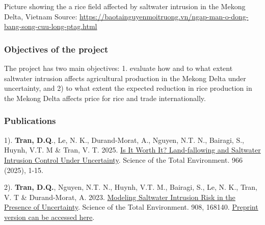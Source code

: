 \documentclass[
]{article}
\author{}
\date{\vspace{-2.5em}}
\begin{document}
\hypertarget{section}{%
\section{}\label{section}}

\hypertarget{section-1}{%
\section{}\label{section-1}}

Picture showing the a rice field affected by saltwater intrusion in the
Mekong Delta, Vietnam Source:
\url{https://baotainguyenmoitruong.vn/ngap-man-o-dong-bang-song-cuu-long-ptag.html}

\hypertarget{objectives-of-the-project}{%
\subsubsection{\texorpdfstring{\textbf{Objectives of the
project}}{Objectives of the project}}\label{objectives-of-the-project}}

The project has two main objectives: 1. evaluate how and to what extent
saltwater intrusion affects agricultural production in the Mekong Delta
under uncertainty, and 2) to what extent the expected reduction in rice
production in the Mekong Delta affects price for rice and trade
internationally.

\hypertarget{publications}{%
\subsubsection{\texorpdfstring{\textbf{Publications}}{Publications}}\label{publications}}

1). \textbf{Tran, D.Q}., Le, N. K., Durand-Morat, A., Nguyen, N.T. N.,
Bairagi, S., Huynh, V.T. M \& Tran, V. T. 2025.
\href{https://authors.elsevier.com/a/1kYnzB8cd44R0}{Is It Worth It?
Land-fallowing and Saltwater Intrusion Control Under Uncertainty}.
Science of the Total Environment. 966 (2025), 1-15.

2). \textbf{Tran, D.Q.}, Nguyen, N.T. N., Huynh, V.T. M., Bairagi, S.,
Le, N. K., Tran, V. T \& Durand-Morat, A. 2023.
\href{https://doi.org/10.1016/j.scitotenv.2023.168140}{Modeling
Saltwater Intrusion Risk in the Presence of Uncertainty}. Science of the
Total Environment. 908, 168140.
\href{https://papers.ssrn.com/sol3/papers.cfm?abstract_id=4510877}{Preprint
version can be accessed here}.
\end{document}
